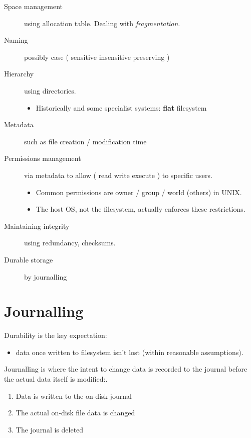 \documentclass[slides]{pgnotes}
\begin{document}
\begin{description}
\item[Space management]
  using allocation table. Dealing with \emph{fragmentation}.
\item[Naming]
  possibly case ( sensitive \textbar{} insensitive \textbar{} preserving )
\item[Hierarchy]
  using directories.
  \begin{itemize}
    
  \item
    Historically and some specialist systems: \textbf{flat} filesystem
  \end{itemize}
\item[Metadata]
  such as file creation / modification time
\item[Permissions management]
  via metadata to allow ( read \textbar{} write \textbar{} execute ) to
  specific users.
  
  \begin{itemize}
  \item
    Common permissions are owner / group / world (others) in UNIX.
  \item
    The host OS, not the filesystem, actually enforces these restrictions.
  \end{itemize}
\item[Maintaining integrity]
  using redundancy, checksums.
\item[Durable storage]
  by journalling
\end{description}

\section{Journalling}
\label{sec:journalling}

Durability is the key expectation:
\begin{itemize}
\item data once written to filesystem isn't lost (within reasonable assumptions).
\end{itemize}

Journalling is where the intent to change data is recorded to the journal before the actual data itself is modified:. 
\begin{enumerate}
\item
  Data is written to the on-disk journal
\item
  The actual on-disk file data is changed
\item
  The journal is deleted
\end{enumerate}
\end{document}
